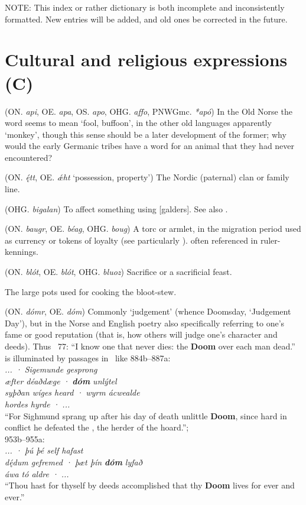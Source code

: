 
NOTE: This index or rather dictionary is both incomplete and inconsistently formatted. New entries will be added, and old ones be corrected in the future.

\section{Cultural and religious expressions (C)}
\begin{itemize}

 (ON. \emph{api}, OE. \emph{apa}, OS. \emph{apo}, OHG. \emph{affo}, PNWGmc. \emph{*apó})
  In the Old Norse the word seems to mean ‘fool, buffoon’, in the other old languages apparently ‘monkey’, though this sense should be a later development of the former; why would the early Germanic tribes have a word for an animal that they had never encountered?

 (ON. \emph{ę́tt}, OE. \emph{ǽht} ‘possession, property’)
  The Nordic (paternal) clan or family line.

 (OHG. \emph{bigalan})
  To affect something using [galders]. See also .

 (ON. \emph{baugr}, OE. \emph{béag}, OHG. \emph{boug})
  A torc or armlet, in the migration period used as currency or tokens of loyalty (see particularly \Hildebrandslied). often referenced in ruler-kennings.

 (ON. \emph{blót}, OE. \emph{blót}, OHG. \emph{bluoz})
  Sacrifice or a sacrificial feast.

  The large pots used for cooking the bloot-stew.

 (ON. \emph{dómr}, OE. \emph{dóm})
  Commonly ‘judgement’ (whence Doomsday, ‘Judgement Day’), but in the Norse and English poetry also specifically referring to one’s fame or good reputation (that is, how others will judge one’s character and deeds). Thus \Havamal\ 77: “I know one that never dies: the \textbf{Doom} over each man dead.” is illuminated by passages in \Beowulf\ like 884b–887a: \\ \emph{... · Sigemunde gesprong \\ æfter déaðdæge · \textbf{dóm} unlýtel \\ syþðan wíges heard · wyrm ácwealde \\ hordes hyrde · ...} \\ “For Sighmund sprang up after his day of death unlittle \textbf{Doom}, since hard in conflict he defeated the , the herder of the hoard.”; \\ 953b–955a: \\ \emph{... · þú þé self hafast \\ dę́dum gefremed · þæt þín \textbf{dóm} lyfað \\ áwa tó aldre · ...} \\ “Thou hast for thyself by deeds accomplished that thy \textbf{Doom} lives for ever and ever.”


\end{itemize}
